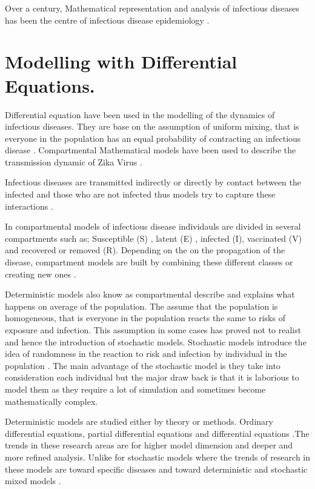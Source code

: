 Over a  century, Mathematical representation and analysis of infectious diseases has been the centre of  infectious disease epidemiology \citep{b2005}. 
\section{Modelling with Differential Equations.}

Differential equation have been used in the modelling of the dynamics of infectious diseases. They are base on the assumption of uniform mixing, that is everyone in the population has an equal probability of contracting an infectious disease \citep{kaplan2002emergency}.
Compartmental Mathematical models have been used to describe the transmission dynamic of Zika Virus \citep{gao2016}.


 Infectious diseases are transmitted indirectly  or directly by contact between the infected and those who are not infected thus models try to capture these interactions \citep{sat}. 
 
In compartmental models of infectious disease individauls are divided in  several compartments such as; Susceptible (S) , latent (E) , infected (I), vaccinated (V) and recovered or removed (R). Depending on the on the propagation of the disease, compartment models are built by combining these different classes or creating new ones \citep{li}.

 
 Deterministic models also know as compartmental describe and explains what happens on average of the population. The assume that the population is homogeneous, that is everyone in the population reacts the same to risks of exposure and infection. This assumption in some cases has proved not to realist and hence the introduction of stochastic models.  Stochastic models introduce the idea of randomness in the reaction to risk and infection by individual in the population \citep{ming2016stochastic}. The main advantage of the stochastic model is they take into consideration each individual but the major draw back is that it is laborious to model them as they require a lot of simulation and sometimes become mathematically complex.
 
 Deterministic models are studied either by theory or methods. Ordinary differential equations, partial differential equations and differential equations \citep{keeling2008modeling}.The trends in these research areas are for higher model dimension and deeper and more refined analysis. Unlike for stochastic models where the trends of research in these models are
toward specific diseases and toward deterministic and stochastic mixed models \citep{fu2013propagation}.


